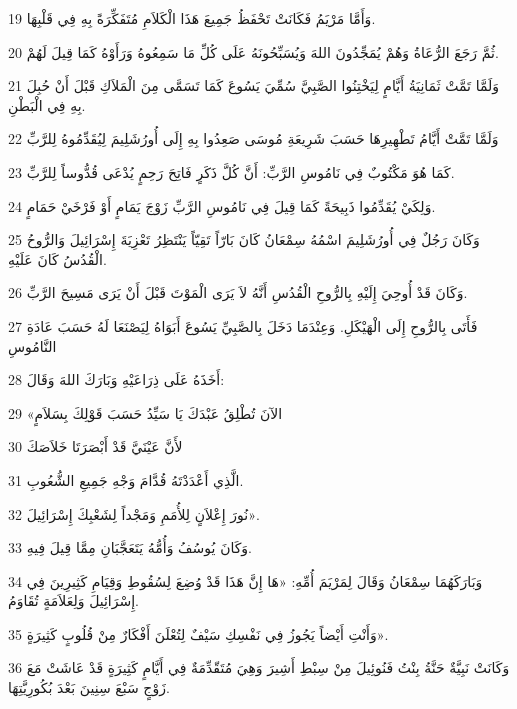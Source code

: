 \par 19 وَأَمَّا مَرْيَمُ فَكَانَتْ تَحْفَظُ جَمِيعَ هَذَا الْكَلاَمِ مُتَفَكِّرَةً بِهِ فِي قَلْبِهَا.
\par 20 ثُمَّ رَجَعَ الرُّعَاةُ وَهُمْ يُمَجِّدُونَ اللهَ وَيُسَبِّحُونَهُ عَلَى كُلِّ مَا سَمِعُوهُ وَرَأَوْهُ كَمَا قِيلَ لَهُمْ.
\par 21 وَلَمَّا تَمَّتْ ثَمَانِيَةُ أَيَّامٍ لِيَخْتِنُوا الصَّبِيَّ سُمِّيَ يَسُوعَ كَمَا تَسَمَّى مِنَ الْمَلاَكِ قَبْلَ أَنْ حُبِلَ بِهِ فِي الْبَطْنِ.
\par 22 وَلَمَّا تَمَّتْ أَيَّامُ تَطْهِيرِهَا حَسَبَ شَرِيعَةِ مُوسَى صَعِدُوا بِهِ إِلَى أُورُشَلِيمَ لِيُقَدِّمُوهُ لِلرَّبِّ
\par 23 كَمَا هُوَ مَكْتُوبٌ فِي نَامُوسِ الرَّبِّ: أَنَّ كُلَّ ذَكَرٍ فَاتِحَ رَحِمٍ يُدْعَى قُدُّوساً لِلرَّبِّ.
\par 24 وَلِكَيْ يُقَدِّمُوا ذَبِيحَةً كَمَا قِيلَ فِي نَامُوسِ الرَّبِّ زَوْجَ يَمَامٍ أَوْ فَرْخَيْ حَمَامٍ.
\par 25 وَكَانَ رَجُلٌ فِي أُورُشَلِيمَ اسْمُهُ سِمْعَانُ كَانَ بَارّاً تَقِيّاً يَنْتَظِرُ تَعْزِيَةَ إِسْرَائِيلَ وَالرُّوحُ الْقُدُسُ كَانَ عَلَيْهِ.
\par 26 وَكَانَ قَدْ أُوحِيَ إِلَيْهِ بِالرُّوحِ الْقُدُسِ أَنَّهُ لاَ يَرَى الْمَوْتَ قَبْلَ أَنْ يَرَى مَسِيحَ الرَّبِّ.
\par 27 فَأَتَى بِالرُّوحِ إِلَى الْهَيْكَلِ. وَعِنْدَمَا دَخَلَ بِالصَّبِيِّ يَسُوعَ أَبَوَاهُ لِيَصْنَعَا لَهُ حَسَبَ عَادَةِ النَّامُوسِ
\par 28 أَخَذَهُ عَلَى ذِرَاعَيْهِ وَبَارَكَ اللهَ وَقَالَ:
\par 29 «الآنَ تُطْلِقُ عَبْدَكَ يَا سَيِّدُ حَسَبَ قَوْلِكَ بِسَلاَمٍ
\par 30 لأَنَّ عَيْنَيَّ قَدْ أَبْصَرَتَا خَلاَصَكَ
\par 31 الَّذِي أَعْدَدْتَهُ قُدَّامَ وَجْهِ جَمِيعِ الشُّعُوبِ.
\par 32 نُورَ إِعْلاَنٍ لِلأُمَمِ وَمَجْداً لِشَعْبِكَ إِسْرَائِيلَ».
\par 33 وَكَانَ يُوسُفُ وَأُمُّهُ يَتَعَجَّبَانِ مِمَّا قِيلَ فِيهِ.
\par 34 وَبَارَكَهُمَا سِمْعَانُ وَقَالَ لِمَرْيَمَ أُمِّهِ: «هَا إِنَّ هَذَا قَدْ وُضِعَ لِسُقُوطِ وَقِيَامِ كَثِيرِينَ فِي إِسْرَائِيلَ وَلِعَلاَمَةٍ تُقَاوَمُ.
\par 35 وَأَنْتِ أَيْضاً يَجُوزُ فِي نَفْسِكِ سَيْفٌ لِتُعْلَنَ أَفْكَارٌ مِنْ قُلُوبٍ كَثِيرَةٍ».
\par 36 وَكَانَتْ نَبِيَّةٌ حَنَّةُ بِنْتُ فَنُوئِيلَ مِنْ سِبْطِ أَشِيرَ وَهِيَ مُتَقّدِّمَةٌ فِي أَيَّامٍ كَثِيرَةٍ قَدْ عَاشَتْ مَعَ زَوْجٍ سَبْعَ سِنِينَ بَعْدَ بُكُورِيَّتِهَا.
